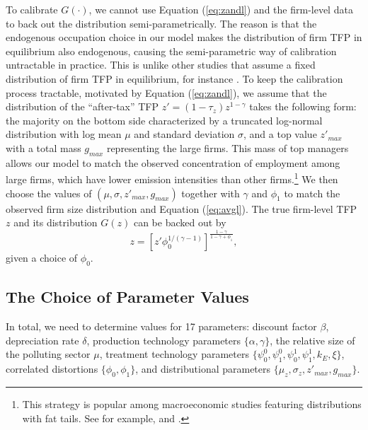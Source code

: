\documentclass[AEJ]{AEA}
\begin{document}
To calibrate $G(\cdot)$, we cannot use Equation (\ref{eq:zandl}) and the firm-level data to back out the distribution semi-parametrically. The reason is that the endogenous occupation choice in our model makes the distribution of firm TFP in equilibrium also endogenous, causing the semi-parametric way of calibration untractable in practice. This is unlike other studies that assume a fixed distribution of firm TFP in equilibrium, for instance \citet{BentoRestuccia:2016}. To keep the calibration process tractable, motivated by Equation (\ref{eq:zandl}), we assume that the distribution of the ``after-tax'' TFP $z' = (1-\tau_z)z^{1-\gamma}$ takes the following form: the majority on the bottom side characterized by a truncated log-normal distribution with log mean $\mu$ and standard deviation $\sigma$, and a top value $z'_{max}$ with a total mass $g_{max}$ representing the large firms. This mass of top managers allows our model to match the observed concentration of employment among large firms, which have lower emission intensities than other firms.\footnote{This strategy is popular among macroeconomic studies featuring distributions with fat tails. See for example, \citet{Castanedaetal:2003} and \citet{Guneretal:2008}.} We then choose the values of $(\mu, \sigma, z'_{max}, g_{max})$ together with $\gamma$ and $\phi_1$ to match the observed firm size distribution and Equation (\ref{eq:avgl}). The true firm-level TFP $z$ and its distribution $G(z)$ can be backed out by
\begin{equation*}
    z = \left[z'\phi_0^{1/(\gamma-1)}\right]^{\frac{1-\gamma}{1-\gamma+\phi_1}},
\end{equation*}
given a choice of $\phi_0$.

\subsection{The Choice of Parameter Values}

In total, we need to determine values for 17 parameters: discount factor $\beta$, depreciation rate $\delta$, production technology parameters $\{\alpha, \gamma \}$, the relative size of the polluting sector $\mu$, treatment technology parameters $\{\psi_0^{0}, \psi_1^{0}, \psi_0^{1}, \psi_1^{1}, k_E, \xi \}$, correlated distortions $\{ \phi_0, \phi_1 \}$, and distributional parameters $\{\mu_z, \sigma_z, z'_{max}, g_{max}\}$.
\end{document}

